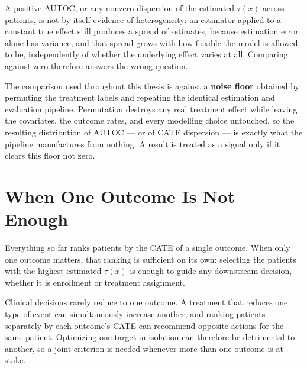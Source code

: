 A positive AUTOC, or any nonzero dispersion of the estimated $\tau(x)$ across
patients, is not by itself evidence of heterogeneity: an estimator applied to
a constant true effect still produces a spread of estimates, because
estimation error alone has variance, and that spread grows with how flexible
the model is allowed to be, independently of whether the underlying effect
varies at all. Comparing against zero therefore answers the wrong question.

\vspace{10pt}

The comparison used throughout this thesis is against a \textbf{noise floor}
obtained by permuting the treatment labels and repeating the identical
estimation and evaluation pipeline. Permutation destroys any real treatment
effect while leaving the covariates, the outcome rates, and every modelling
choice untouched, so the resulting distribution of AUTOC — or of CATE
dispersion — is exactly what the pipeline manufactures from nothing. A result
is treated as a signal only if it clears this floor not zero.

\section{When One Outcome Is Not Enough}
\label{sec:multi-outcome}

Everything so far ranks patients by the CATE of a single outcome. When only
one outcome matters, that ranking is sufficient on its own: selecting the
patients with the highest estimated $\tau(x)$ is enough to guide any
downstream decision, whether it is enrollment or treatment assignment.

\vspace{10pt}

Clinical decisions rarely reduce to one outcome. A treatment that reduces
one type of event can simultaneously increase another, and ranking patients
separately by each outcome's CATE can recommend opposite actions for the
same patient. Optimizing one target in isolation can therefore be
detrimental to another, so a joint criterion is needed whenever more than
one outcome is at stake.

\vspace{10pt}

